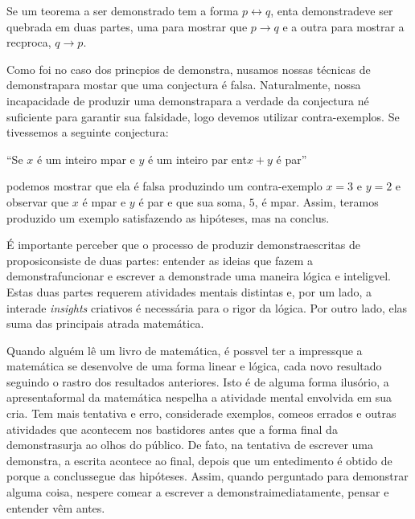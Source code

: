 Se um teorema a ser demonstrado tem a forma $p\leftrightarrow q$, ent\ao a demonstra\cao deve ser quebrada em duas partes, uma para mostrar que $p\to q$ e a outra para mostrar a rec\ih proca, $q\to p.$

Como foi no caso dos princ\ih pios de demonstra\caoi, n\ao usamos nossas t\'ecnicas de demonstra\cao para mostar que uma conjectura \'e falsa. Naturalmente, nossa incapacidade de produzir uma demonstra\cao para a verdade da conjectura n\ao \'e suficiente para garantir sua falsidade, logo devemos utilizar contra-exemplos. Se tivessemos a seguinte conjectura:

\begin{center}
``Se $x$ \'e um inteiro \ih mpar e $y$ \'e um inteiro par ent\ao $x+y$ \'e par'' \\
\end{center}

\noindent podemos mostrar que ela \'e falsa produzindo um contra-exemplo $x=3$ e $y=2$ e observar que $x$ \'e \ih mpar e $y$ \'e par e que sua soma, $5$, \'e \ih mpar. Assim, ter\ih amos produzido um exemplo satisfazendo as hip\'oteses, mas n\ao a conclus\aoi.

\'E importante perceber que o processo de produzir demonstra\coes escritas de proposi\coes consiste de duas partes: entender as ideias que fazem a demonstra\cao funcionar e escrever a demonstra\cao de uma maneira l\'ogica e intelig\ih vel. Estas duas partes requerem  atividades mentais distintas e, por um lado,  a intera\cao de \emph{insights} criativos \'e necess\'aria para o rigor da l\'ogica. Por outro lado, elas s\ao uma das principais atra\coes da matem\'atica.

Quando algu\'em l\^e um livro de matem\'atica, \'e poss\ih vel ter a impress\ao que a matem\'atica se desenvolve de uma forma linear e l\'ogica, cada novo resultado seguindo o rastro dos resultados anteriores. Isto \'e de alguma forma ilus\'orio, a apresenta\cao formal da matem\'atica n\ao espelha a atividade mental envolvida em sua cria\caoi. Tem mais tentativa e erro, considera\cao de exemplos, come\cc os errados e outras atividades que acontecem nos bastidores antes que a forma final da demonstra\cao surja ao olhos do p\'ublico. De fato, na tentativa de escrever uma demonstra\caoi, a escrita acontece ao final, depois que um entedimento \'e obtido de porque a conclus\ao segue das hip\'oteses. Assim, quando perguntado para demonstrar alguma coisa, n\ao espere come\cc ar a escrever a demonstra\cao imediatamente, pensar e entender v\^em antes.

